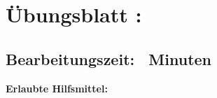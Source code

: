 \section*{\centering Übungsblatt \blattnummer: \blattthema}
\subsection*{\centering Bearbeitungszeit: \bearbeitungszeit\ Minuten}

\ifdefined\lernziele
{}
\fi

\ifdefined\hilfsmittel
\noindent\textbf{Erlaubte Hilfsmittel:} \hilfsmittel
\vspace{0.5cm}
\fi

\ifdefined\bearbeitungshinweise
\noindent\textit{\bearbeitungshinweise}
\vspace{0.5cm}
\fi